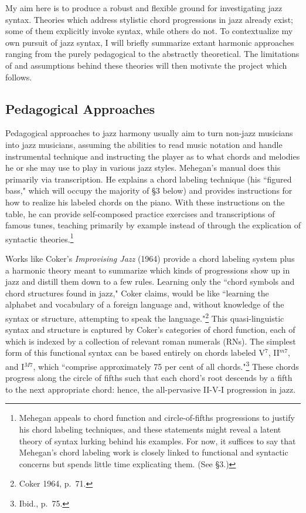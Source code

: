 My aim here is to produce a robust and flexible ground for investigating jazz syntax.  Theories which address stylistic chord progressions in jazz already exist; some of them explicitly invoke syntax, while others do not.  To contextualize my own pursuit of jazz syntax, I will briefly summarize extant harmonic approaches ranging from the purely pedagogical to the abstractly theoretical.  The limitations of and assumptions behind these theories will then motivate the project which follows.

\subsection{Pedagogical Approaches}
Pedagogical approaches to jazz harmony usually aim to turn non-jazz musicians into jazz musicians, assuming the abilities to read music notation and handle instrumental technique and instructing the player as to what chords and melodies he or she may use to play in various jazz styles.  Mehegan's manual does this primarily via transcription.  He explains a chord labeling technique (his ``figured bass," which will occupy the majority of \S 3 below) and provides instructions for how to realize his labeled chords on the piano.  With these instructions on the table, he can provide self-composed practice exercises and transcriptions of famous tunes, teaching primarily by example instead of through the explication of syntactic theories.\footnote{Mehegan appeals to chord function and circle-of-fifths progressions to justify his chord labeling techniques, and these statements might reveal a latent theory of syntax lurking behind his examples.  For now, it suffices to say that Mehegan's chord labeling work is closely linked to functional and syntactic concerns but spends little time explicating them.  (See \S 3.)}

Works like Coker's \emph{Improvising Jazz} (1964) provide a chord labeling system plus a harmonic theory meant to summarize which kinds of progressions show up in jazz and distill them down to a few rules.  Learning only the ``chord symbols and chord structures found in jazz," Coker claims, would be like ``learning the alphabet and vocabulary of a foreign language and, without knowledge of the syntax or structure, attempting to speak the language."\footnote{Coker 1964, p.\ 71.}  This quasi-linguistic syntax and structure is captured by Coker's categories of chord function, each of which is indexed by a collection of relevant roman numerals (RNs).  The simplest form of this functional syntax can be based entirely on chords labeled V$^{7}$, II$^{m7}$, and I$^{M7}$, which ``comprise approximately 75 per cent of all chords."\footnote{Ibid., p.\ 75.}  These chords progress along the circle of fifths such that each chord's root descends by a fifth to the next appropriate chord: hence, the all-pervasive II-V-I progression in jazz.

